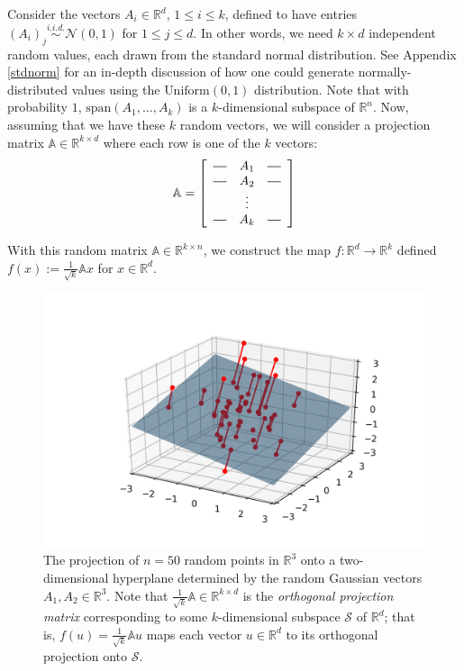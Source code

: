 \documentclass{article}
\newcommand*{\horzbar}{\rule[.5ex]{2.5ex}{0.5pt}}
\begin{document}
Consider the vectors $A_i \in \mathbb{R}^d$, $1 \le i \le k$, defined to have entries $(A_i)_j \overset{i.i.d.}{\sim} \mathcal{N}(0, 1)$ for $1 \le j \le d$. In other words, we need $k\times d$ independent random values, each drawn from the standard normal distribution. See Appendix \ref{stdnorm} for an in-depth discussion of how one could generate normally-distributed values using the $\text{Uniform}(0,1)$ distribution. Note that with probability $1$, $\text{span}\left(A_1, \ldots, A_k \right)$ is a $k$-dimensional subspace of $\mathbb{R}^n$. Now, assuming that we have these $k$ random vectors, we will consider a projection matrix $\mathbb{A} \in \mathbb{R}^{k \times d}$ where each row is one of the $k$ vectors:
\begin{align*}
        \mathbb{A} = 
        \left[
            \begin{array}{ccc}
            \horzbar & A_{1} & \horzbar \\
            \horzbar & A_{2} & \horzbar \\
            & \vdots &  \\
            \horzbar & A_{k} & \horzbar
            \end{array}
        \right]
\end{align*}

With this random matrix $\mathbb{A} \in \mathbb{R}^{k \times n}$, we construct the map $f: \mathbb{R}^d \rightarrow \mathbb{R}^k$ defined $f(x) := \frac{1}{\sqrt{k}}\mathbb{A}x$ for $x \in \mathbb{R}^d$.

    \begin{figure}[H]
        \centering
        \includegraphics[width=\textwidth]{imgs/random_projections.png}
        \caption{The projection of $n = 50$ random points in $\mathbb{R}^3$ onto a two-dimensional hyperplane determined by the random Gaussian vectors $A_1, A_2 \in \mathbb{R}^3$. Note that $\frac{1}{\sqrt{k}} \mathbb{A} \in \mathbb{R}^{k \times d}$ is the \textit{orthogonal projection matrix} corresponding to some $k$-dimensional subspace $\mathcal{S}$ of $\mathbb{R}^d$; that is, $f(u) = \frac{1}{\sqrt{k}}\mathbb{A}u$ maps each vector $u \in \mathbb{R}^d$ to its orthogonal projection onto $\mathcal{S}$.}
    \end{figure}
    
\end{document}
